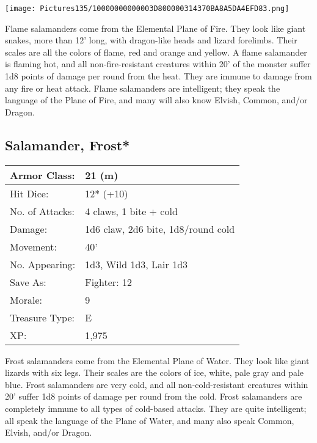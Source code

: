 \documentclass[a4paper,twoside,openany,10pt]{book}
\begin{document}
\begin{multicols}{2}
\begin{center} \texttt{[image: Pictures135/10000000000003D800000314370BA8A5DA4EFD83.png]} \end{center}

Flame salamanders come from the Elemental Plane of Fire. They look like giant snakes, more than 12' long, with dragon-like heads and lizard forelimbs. Their scales are all the colors of flame, red and orange and yellow. A flame salamander is flaming hot, and all non-fire-resistant creatures within 20' of the monster suffer 1d8 points of damage per round from the heat. They are immune to damage from any fire or heat attack. Flame salamanders are intelligent; they speak the language of the Plane of Fire, and many will also know Elvish, Common, and/or Dragon.


\subsection*{Salamander, Frost*}\label{salamander-frost}

\begin{tabularx}{0.50\textwidth}{@{}lX@{}}
Armor Class: & 21 (m) \\\hline
Hit Dice: & 12* (+10) \\\hline
No. of Attacks: & 4 claws, 1 bite + cold \\\hline
Damage: & 1d6 claw, 2d6 bite, 1d8/round cold \\\hline
Movement: & 40' \\\hline
No. Appearing: & 1d3, Wild 1d3, Lair 1d3 \\\hline
Save As: & Fighter: 12 \\\hline
Morale: & 9 \\\hline
Treasure Type: & E \\\hline
XP: & 1,975 \\\hline
\end{tabularx}\medskip

Frost salamanders come from the Elemental Plane of Water. They look like giant lizards with six legs. Their scales are the colors of ice, white, pale gray and pale blue. Frost salamanders are very cold, and all non-cold-resistant creatures within 20' suffer 1d8 points of damage per round from the cold. Frost salamanders are completely immune to all types of cold-based attacks. They are quite intelligent; all speak the language of the Plane of Water, and many also speak Common, Elvish, and/or Dragon.


\end{multicols}
\end{document}
